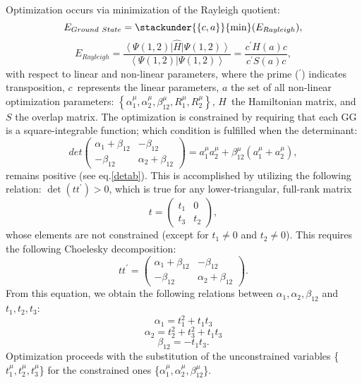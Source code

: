 Optimization occurs via minimization of the Rayleigh quotient:
\begin{equation}
E_{Ground\ State}=\stackunder{\left\{ c,a\right\} }{\min }(E_{Rayleigh}),
\end{equation}
\begin{equation}
E_{Rayleigh}=\frac{\left\langle \Psi (1,2)\right| \widehat{H}\left| \Psi
(1,2)\right\rangle }{\left\langle \Psi (1,2)\right| \left. \Psi
(1,2)\right\rangle }=\frac{c^{\prime }H\left( a\right) c}{c^{\prime }S\left(
a\right) c},
\end{equation}
with respect to linear and non-linear parameters, where the prime ($^{\prime
}$) indicates transposition, $c$\ represents the linear parameters, $a$ the
set of all non-linear optimization parameters: $\left\{ \alpha _1^\mu
,\alpha _2^\mu ,\beta _{12}^\mu ,R_1^\mu ,R_2^\mu \right\} $, $H$\ the
Hamiltonian matrix, and $S$ the overlap matrix. The optimization is
constrained by requiring that each GG is a square-integrable function; which
condition is fulfilled when the determinant: 
\begin{equation}
det\left( 
\begin{array}{ll}
\alpha _1+\beta _{12} & -\beta _{12} \\ 
-\beta _{12} & \alpha _2+\beta _{12}
\end{array}
\right) =a_1^\mu a_2^\mu +\beta _{12}^\mu (a_1^\mu +a_2^\mu ),
\end{equation}
remains positive (see eq.\ref{detab}). This is accomplished by utilizing the
following relation: $\det (tt^{\prime })>0$, which is true for any
lower-triangular, full-rank matrix 
\[
t=\left( 
\begin{array}{ll}
t_1 & 0 \\ 
t_3 & t_2
\end{array}
\right) ,
\]
whose elements are not constrained (except for $t_1\neq 0$ and $t_2\neq 0$).
This requires the following Choelesky decomposition: 
\[
tt^{\prime }=\left( 
\begin{array}{ll}
\alpha _1+\beta _{12} & -\beta _{12} \\ 
-\beta _{12} & \alpha _2+\beta _{12}
\end{array}
\right) .
\]
From this equation, we obtain the following relations between $\alpha
_1,\alpha _2,\beta _{12}$ and $t_1,t_2,t_3$: 
\begin{equation}
\alpha _1=t_1^2+t_1t_3
\end{equation}
\begin{equation}
\alpha _2=t_2^2+t_3^2+t_1t_3
\end{equation}
\begin{equation}
\beta _{12}=-t_1t_3.
\end{equation}
Optimization proceeds with the substitution of the unconstrained variables \{%
$t_1^\mu ,t_2^\mu ,t_3^\mu $\} for the constrained ones \{$\alpha _1^\mu
,\alpha _2^\mu ,\beta _{12}^\mu $\}.

